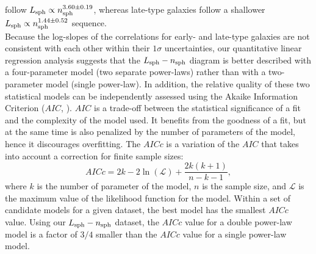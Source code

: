 \documentclass[preprint2]{emulateapj}
\begin{document}
follow $L_{\rm sph} \propto n_{\rm sph}^{3.60 \pm 0.19}$, 
whereas late-type galaxies follow a shallower $L_{\rm sph} \propto n_{\rm sph}^{1.44 \pm 0.52}$ sequence. \\
Because the log-slopes of the correlations for early- and late-type galaxies are not consistent with each other 
within their $1\sigma$ uncertainties, 
our quantitative linear regression analysis suggests that 
the $L_{\rm sph} - n_{\rm sph}$ diagram is better described with a four-parameter model 
(two separate power-laws) 
rather than with a two-parameter model (single power-law). 
In addition, the relative quality of these two statistical models can be independently assessed 
using the Akaike Information Criterion ($AIC$, \citealt{akaike1974}). 
$AIC$ is a trade-off between the statistical significance of a fit and the complexity of the model used. 
It benefits from the goodness of a fit, 
but at the same time is also penalized by the number of parameters of the model, 
hence it discourages overfitting. 
The $AICc$ is a variation of the $AIC$ that takes into account a correction for finite sample sizes: 
\begin{equation}
AICc = 2k - 2 \ln(\mathcal{L}) + \frac{2k (k+1)}{n-k-1} ,
\end{equation}
where $k$ is the number of parameter of the model, 
$n$ is the sample size, 
and $\mathcal{L}$ is the maximum value of the likelihood function for the model. 
Within a set of candidate models for a given dataset, 
the best model has the smallest $AICc$ value. 
Using our $L_{\rm sph} - n_{\rm sph}$ dataset, 
the $AICc$ value for a double power-law model is a factor of $3/4$ smaller 
than the $AICc$ value for a single power-law model. 
\end{document}
